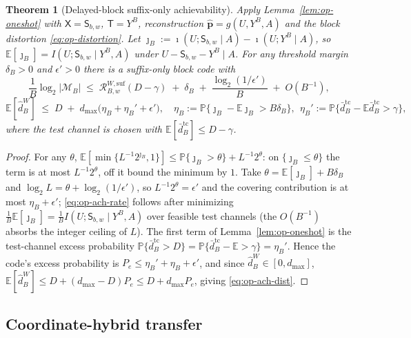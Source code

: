 \documentclass[11pt]{article}
\newcommand{\E}{\mathbb{E}}
\newcommand{\Prob}{\mathbb{P}}
\theoremstyle{plain}
\newtheorem{theorem}{Theorem}[section]
\theoremstyle{definition}
\theoremstyle{remark}
\begin{document}
\begin{theorem}[Delayed-block suffix-only achievability]
\label{thm:op-ach}
Apply Lemma~\ref{lem:op-oneshot} with
$\mathsf X=\mathsf S_{b,w}$, $\mathsf T=Y^B$, reconstruction
$\widehat{\mathbf p}=g(U,Y^B,A)$ and the block distortion
\eqref{eq:op-distortion}. Let $\jmath_B:=\imath(U;\mathsf S_{b,w}\mid A)-\imath(U;Y^B\mid A)$,
so $\E[\jmath_B]=I(U;\mathsf S_{b,w}\mid Y^B,A)$ under
$U-\mathsf S_{b,w}-Y^B\mid A$. For any threshold margin $\delta_B>0$
and $\epsilon'>0$ there is a suffix-only block code with
\begin{equation}
\label{eq:op-ach-rate}
\frac1B\log_2|\mathcal M_B|\;\le\;\mathcal R^{W,\mathrm{suf}}_{B,w}(D-\gamma)
\;+\;\delta_B\;+\;\frac{\log_2(1/\epsilon')}{B}\;+\;O(B^{-1}),
\end{equation}
\begin{equation}
\label{eq:op-ach-dist}
\E[\widehat d_B^{W}]\;\le\;D\;+\;d_{\max}\bigl(\eta_B+\eta_B'+\epsilon'\bigr),
\quad
\eta_B:=\Prob\{\jmath_B-\E\jmath_B>B\delta_B\},\ \ \eta_B':=\Prob\{\bar d_B^{\mathrm{tc}}-\E\bar d_B^{\mathrm{tc}}>\gamma\},
\end{equation}
where the test channel is chosen with $\E[\bar d_B^{\mathrm{tc}}]\le D-\gamma$.
\end{theorem}
\begin{proof}
For any $\theta$,
$\E[\min\{L^{-1}2^{\jmath_B},1\}]\le\Prob\{\jmath_B>\theta\}+L^{-1}2^{\theta}$:
on $\{\jmath_B\le\theta\}$ the term is at most $L^{-1}2^{\theta}$, off
it bound the minimum by $1$. Take
$\theta=\E[\jmath_B]+B\delta_B$ and $\log_2 L=\theta+\log_2(1/\epsilon')$,
so $L^{-1}2^{\theta}=\epsilon'$ and the covering contribution is at
most $\eta_B+\epsilon'$; \eqref{eq:op-ach-rate} follows after
minimizing $\tfrac1B\E[\jmath_B]=\tfrac1B I(U;\mathsf S_{b,w}\mid Y^B,A)$
over feasible test channels (the $O(B^{-1})$ absorbs the integer
ceiling of $L$). The first term of Lemma~\ref{lem:op-oneshot} is the
test-channel excess probability
$\Prob\{\bar d_B^{\mathrm{tc}}>D\}=\Prob\{\bar d_B^{\mathrm{tc}}-\E>\gamma\}=\eta_B'$.
Hence the code's excess probability is $P_e\le\eta_B'+\eta_B+\epsilon'$,
and since $\widehat d_B^W\in[0,d_{\max}]$,
$\E[\widehat d_B^W]\le D+(d_{\max}-D)P_e\le D+d_{\max}P_e$, giving
\eqref{eq:op-ach-dist}.
\end{proof}

\subsection{Coordinate-hybrid transfer}
\label{app:op-hybrid}
\end{document}
